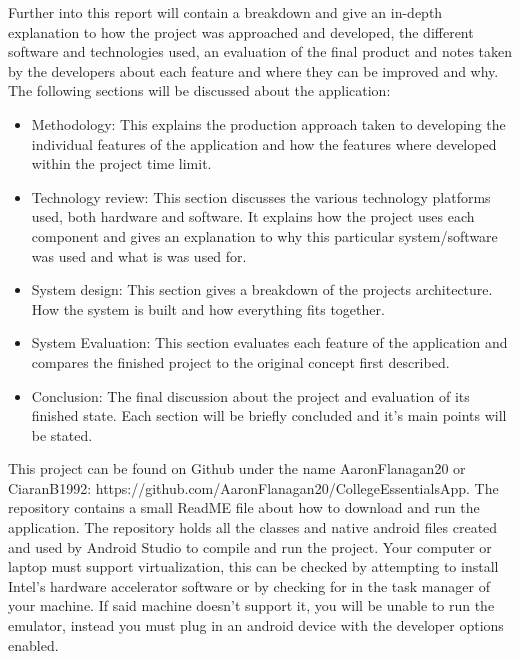 Further into this report will contain a breakdown and give an in-depth explanation to how the project was approached and developed, the different software and technologies used, an evaluation of the final product and notes taken by the developers about each feature and where they can be improved and why. The following sections will be discussed about the application:
\begin{itemize}
\item Methodology: This explains the production approach taken to developing the individual features of the application and how the features where developed within the project time limit.
\item Technology review: This section discusses the various technology platforms used, both hardware and software. It explains how the project uses each component and gives an explanation to why this particular system/software was used and what is was used for.
\item System design: This section gives a breakdown of the projects architecture. How the system is built and how everything fits together.
\item System Evaluation: This section evaluates each feature of the application and compares the finished project to the original concept first described.
\item Conclusion: The final discussion about the project and evaluation of its finished state. Each section will be briefly concluded and it's main points will be stated.
\end{itemize}

This project can be found on Github under the name AaronFlanagan20 or CiaranB1992: https://github.com/AaronFlanagan20/CollegeEssentialsApp.
The repository contains a small ReadME file about how to download and run the application. The repository holds all the classes and native android files created and used by Android Studio to compile and run the project. Your computer or laptop must support virtualization, this can be checked by attempting to install Intel's hardware accelerator software or by checking for in the task manager of your machine. If said machine doesn't support it, you will be unable to run the emulator, instead you must plug in an android device with the developer options enabled.

